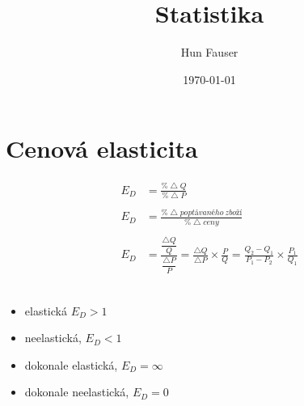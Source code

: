 \documentclass[a4paper,12pt]{article}
\title{Statistika}
\author{Hun Fauser}
\date{\today}
\begin{document}

\maketitle

\section{Cenová elasticita}

\begin{align*}
	E_{D} &= \frac{ \%  \bigtriangleup Q}{\%  \bigtriangleup P} \\ \\
	E_{D} &= \frac{ \%  \bigtriangleup poptávaného~zboží}{\%  \bigtriangleup ceny} \\ \\
	E_{D} &= \frac{\dfrac{\bigtriangleup Q}{Q}}{\dfrac{\bigtriangleup P}{P}} 
	= \frac{\bigtriangleup Q}{\bigtriangleup P} \times \frac{P}{Q}
	= \frac{Q_{2} - Q_{1}}{P_{1} - P_{2}} \times \frac{P_{1}}{Q_{1}}
\end{align*} \\

\begin{itemize}
	\item elastická $E_{D} > 1$
	\item neelastická, $E_{D} < 1$
	\item dokonale elastická, $E_{D} = \infty$
	\item dokonale neelastická, $E_{D} = 0$
\end{itemize}
\end{document}
